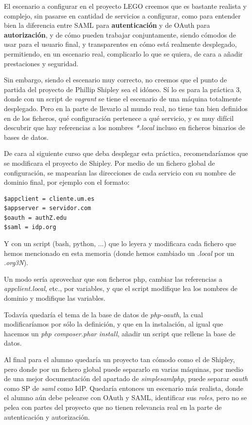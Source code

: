 \documentclass[]{article}
\begin{document}
El escenario a configurar en el proyecto LEGO creemos que es bastante realista y complejo, sin pasarse en cantidad de servicios a configurar, como para entender bien la diferencia entre SAML para \textbf{autenticación} y de OAuth para \textbf{autorización}, y de cómo pueden trabajar conjuntamente, siendo cómodos de usar para el usuario final, y transparentes en cómo está realmente desplegado, permitiendo, en un escenario real, complicarlo lo que se quiera, de cara a añadir prestaciones y seguridad.

\hfill

Sin embargo, siendo el escenario muy correcto, no creemos que el punto de partida del proyecto de Phillip Shipley sea el idóneo. Sí lo es para la práctica 3, donde con un script de \textit{vagrant} se tiene el escenario de una máquina totalmente desplegado. Pero en la parte de llevarlo al mundo real, no tiene tan bien definidos en de los ficheros, qué configuración pertenece a qué servicio, y es muy difícil descubrir que hay referencias a los nombres \textit{*.local} incluso en ficheros binarios de bases de datos.

\hfill

De cara al siguiente curso que deba desplegar esta práctica, recomendaríamos que se modificara el proyecto de Shipley. Por medio de un fichero global de configuración, se mapearían las direcciones de cada servicio con su nombre de dominio final, por ejemplo con el formato:

\begin{verbatim}
$appclient = cliente.um.es
$appserver = servidor.com
$oauth = authZ.edu
$saml = idp.org
\end{verbatim} 

Y con un script (bash, python, ...) que lo leyera y modificara cada fichero que hemos mencionado en esta memoria (donde hemos cambiado un \textit{.local} por un \textit{.org3N}).

Un modo sería aprovechar que son ficheros php, cambiar las referencias a \textit{appclient.local}, etc., por variables, y que el script modifique lea los nombres de dominio y modifique las variables.

Todavía quedaría el tema de la base de datos de \textit{php-oauth}, la cual modificaríamos por sólo la definición, y que en la instalación, al igual que hacemos un \textit{php composer.phar install}, añadir un script que rellene la base de datos.


\hfill


Al final para el alumno quedaría un proyecto tan cómodo como el de Shipley, pero donde por un fichero global puede separarlo en varias máquinas, por medio de una mejor documentación del apartado de \textit{simplesamlphp}, puede separar \textit{oauth} como SP de \textit{saml} como IdP. Quedaría entonces un escenario más realista, donde el alumno aún debe pelearse con OAuth y SAML, identificar sus \textit{roles}, pero no se pelea con partes del proyecto que no tienen relevancia real en la parte de autenticación y autorización.
\end{document}
